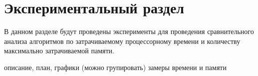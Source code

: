 \chapter{Экспериментальный раздел}
\label{cha:research}
    В данном разделе будут проведены эксперименты для проведения 
    сравнительного анализа алгоритмов по затрачиваемому процессорному 
    времени\cite{CPU-time} и количеству максимально затрачиваемой памяти.

    описание, план, графики (можно групировать)
    замеры времени и памяти
\newpage